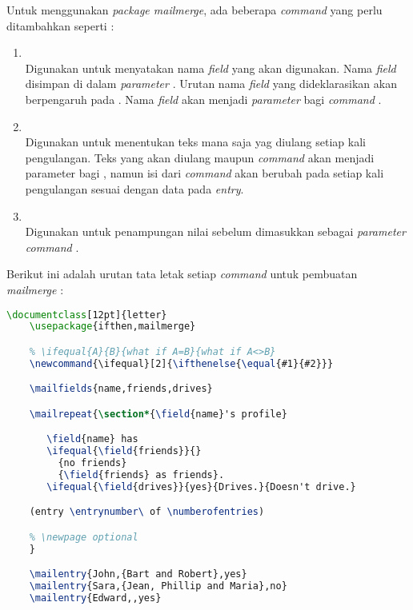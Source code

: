 Untuk menggunakan \textit{package mailmerge}, ada beberapa \textit{command} yang perlu ditambahkan seperti \cite{Frasson:2009} :
\begin{enumerate}
	\item \texttt{\string\mailfields}\\
	Digunakan untuk menyatakan nama \textit{field} yang akan digunakan. Nama \textit{field} disimpan di dalam \textit{parameter} \texttt{\string\mailfields}. Urutan nama \textit{field} yang dideklarasikan akan berpengaruh pada \texttt{\string\mailentry}. Nama \textit{field} akan menjadi \textit{parameter} bagi \textit{command} \texttt{\string\field}.
	\item \texttt{\string\mailrepeat}\\
	Digunakan untuk menentukan teks mana saja yag diulang setiap kali pengulangan. Teks yang akan diulang maupun \textit{command} \texttt{\string\field} akan menjadi parameter bagi \texttt{\string\mailrepeat}, namun isi dari \textit{command} \texttt{\string\field} akan berubah pada setiap kali pengulangan sesuai dengan data pada \textit{entry}.
	\item \texttt{\string\mailentry}\\
	Digunakan untuk penampungan nilai sebelum dimasukkan sebagai \textit{parameter} \textit{command} \texttt{\string\field}.
\end{enumerate}
	Berikut ini adalah urutan tata letak setiap \textit{command} untuk pembuatan \textit{mailmerge} :
	\begin{lstlisting}[language=tex,basicstyle=\tiny,caption=Contoh pembuatan \textit{mailmerge}]
	\documentclass[12pt]{letter}
    \usepackage{ifthen,mailmerge}

    % \ifequal{A}{B}{what if A=B}{what if A<>B}
    \newcommand{\ifequal}[2]{\ifthenelse{\equal{#1}{#2}}}

    \mailfields{name,friends,drives}

    \mailrepeat{\section*{\field{name}'s profile}

       \field{name} has
       \ifequal{\field{friends}}{}
         {no friends}
         {\field{friends} as friends}.
       \ifequal{\field{drives}}{yes}{Drives.}{Doesn't drive.}

    (entry \entrynumber\ of \numberofentries)

    % \newpage optional
    }

    \mailentry{John,{Bart and Robert},yes}
    \mailentry{Sara,{Jean, Phillip and Maria},no}
    \mailentry{Edward,,yes}
 \end{lstlisting}
 
